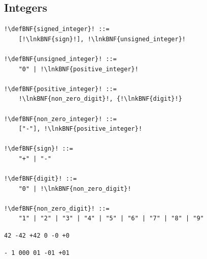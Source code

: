 \documentclass[a4paper]{article}
\newcommand{\defBNF}[1]{\hypertarget{def:#1}{<\detokenize{#1}>}}
\newcommand{\lnkBNF}[1]{\hyperlink{def:#1}{<\detokenize{#1}>}}
\begin{document}
\subsection{Integers}\label{sec:integers}
\begin{lstlisting}
!\defBNF{signed_integer}! ::=
	[!\lnkBNF{sign}!], !\lnkBNF{unsigned_integer}!

!\defBNF{unsigned_integer}! ::=
	"0" | !\lnkBNF{positive_integer}!

!\defBNF{positive_integer}! ::=
	!\lnkBNF{non_zero_digit}!, {!\lnkBNF{digit}!}

!\defBNF{non_zero_integer}! ::=
	["-"], !\lnkBNF{positive_integer}!

!\defBNF{sign}! ::=
	"+" | "-"

!\defBNF{digit}! ::=
	"0" | !\lnkBNF{non_zero_digit}!

!\defBNF{non_zero_digit}! ::=
	"1" | "2" | "3" | "4" | "5" | "6" | "7" | "8" | "9"
\end{lstlisting}
\begin{minipage}{.49\linewidth}
	\begin{lstlisting}[language=veripb, gobble=4, rulecolor=\color{veripb-valid-text}, caption={Syntactically correct signed integers.}]
	42 -42 +42 0 -0 +0
	\end{lstlisting}
\end{minipage}\hfill%
\begin{minipage}{.49\linewidth}
	\begin{lstlisting}[language=veripb, gobble=4, rulecolor=\color{veripb-invalid-text}, caption={Syntactically incorrect signed integers.}]
	- 1 000 01 -01 +01
	\end{lstlisting}
\end{minipage}
\end{document}
